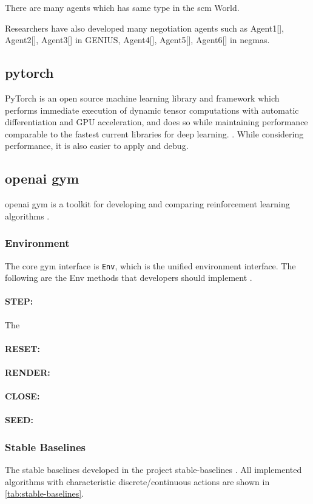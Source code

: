 There are many agents which has same type in the \gls{scm} World. 

Researchers have also developed many negotiation agents such as Agent1[], Agent2[], Agent3[] in GENIUS, Agent4[], Agent5[], Agent6[] in \gls{negmas}.

\subsection{\gls{pytorch}} PyTorch is an open source machine learning library and framework which performs immediate execution of dynamic tensor computations with automatic differentiation and GPU acceleration, and does so while maintaining performance comparable to the fastest current libraries for deep learning. \parencite{NEURIPS2019_bdbca288}. While considering performance, it is also easier to apply and debug.

\subsection{\gls{openai gym}}
\gls{openai gym} is a toolkit for developing and comparing reinforcement learning algorithms \parencite{brockman2016openai}.
\subsubsection{Environment}
The core gym interface is \texttt{Env}, which is the unified environment interface. The following are the Env methods that developers should implement \parencite{NEURIPS2019_bdbca288}.

\paragraph{STEP:} The 
\paragraph{RESET:}
\paragraph{RENDER:}
\paragraph{CLOSE:}
\paragraph{SEED:}

\subsubsection{Stable Baselines}
The stable baselines developed in the project stable-baselines \parencite{stable-baselines}. All implemented algorithms with characteristic discrete/continuous actions are shown in \ref{tab:stable-baselines}.

